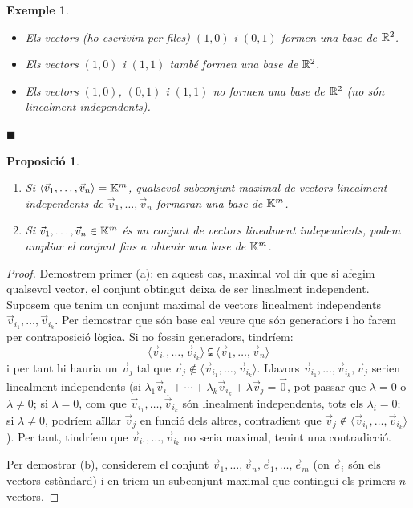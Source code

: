 \documentclass[
  11pt,
]{book}
\numberwithin{dummy}{section}
\theoremstyle{maincolornumbox}
\theoremstyle{blacknumex}
\newtheorem{exampleT}{Exemple}[chapter]
\theoremstyle{blacknumbox}
\theoremstyle{maincolornum}
\newtheorem{propositionT}{Proposició}[chapter]
\newenvironment{proposition}{\begin{pBox}\begin{propositionT}}{\end{propositionT}\end{pBox}}
\newenvironment{example}{\begin{exampleT}}{\hfill{\tiny\ensuremath{\blacksquare}}\end{exampleT}}
\begin{document}
\begin{example}
\leavevmode

\begin{itemize}
\item
  Els vectors (ho escrivim per files) \((1,0)\) i \((0,1)\) formen una
  base de \(\mathbb{R}^2\).
\item
  Els vectors \((1,0)\) i \((1,1)\) també formen una base de \(\mathbb{R}^2\).
\item
  Els vectors \((1,0)\), \((0,1)\) i \((1,1)\) no formen una base de \(\mathbb{R}^2\)
  (no són linealment independents).
\end{itemize}

\end{example}

\begin{proposition}
\leavevmode

\begin{enumerate}
\def\labelenumi{\arabic{enumi}.}
\item
  Si \(\langle \vec v_1, \dots , \vec v_n \rangle = \mathbb{K}^m\), qualsevol
  subconjunt maximal de vectors linealment independents de
  \(\vec v_1, \dots, \vec v_n\) formaran una base de \(\mathbb{K}^m\).
\item
  Si \(\vec v_1, \dots, \vec v_n \in \mathbb{K}^m\) és un conjunt de vectors
  linealment independents, podem ampliar el conjunt fins a obtenir una
  base de \(\mathbb{K}^m\).
\end{enumerate}

\end{proposition}

\begin{proof}
Demostrem primer (a): en aquest cas, maximal vol dir que si
afegim qualsevol vector, el conjunt obtingut deixa de ser linealment
independent. Suposem que tenim un conjunt maximal de vectors linealment
independents \(\vec v_{i_1}, \dots ,\vec v_{i_k}\). Per demostrar que són
base cal veure que són generadors i ho farem per contraposició lògica.
Si no fossin generadors, tindríem:
\[\langle \vec v_{i_1}, \dots ,\vec v_{i_k}\rangle \subsetneqq \langle \vec v_{1}, \dots ,\vec v_{n}\rangle\]
i per tant hi hauria un \(\vec v_j\) tal que
\(\vec v_j \not\in \langle \vec v_{i_1}, \dots ,\vec v_{i_k}\rangle\).
Llavors \(\vec v_{i_1}, \dots ,\vec v_{i_k}, \vec v_j\) serien linealment
independents (si
\(\lambda_1\vec v_{i_1}+\cdots + \lambda_k\vec v_{i_k}+\lambda \vec v_j=\vec 0\),
pot passar que \(\lambda=0\) o \(\lambda\neq0\); si \(\lambda=0\), com que
\(\vec v_{i_1}, \dots ,\vec v_{i_k}\) són linealment independents, tots
els \(\lambda_i=0\); si \(\lambda\neq 0\), podríem aïllar \(\vec v_j\) en
funció dels altres, contradient que
\(\vec v_j \not\in \langle \vec v_{i_1}, \dots ,\vec v_{i_k}\rangle\)).
Per tant, tindríem que \(\vec v_{i_1}, \dots ,\vec v_{i_k}\) no seria
maximal, tenint una contradicció.

Per demostrar (b), considerem el conjunt
\(\vec v_1,\dots,\vec v_n,\vec e_1, \dots, \vec e_m\) (on \(\vec e_i\) són
els vectors estàndard) i en triem un subconjunt maximal que contingui
els primers \(n\) vectors.
\end{proof}
\end{document}
